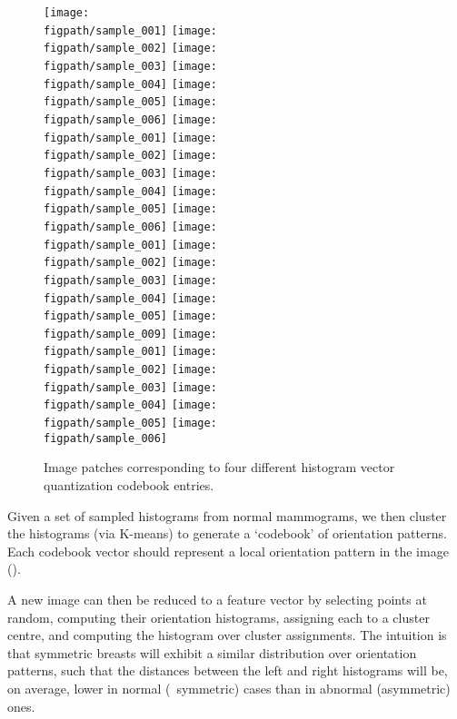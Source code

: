 \begin{figure}[t]
	\centering
		\def\figpath{\figroot/asymmetry/centre_001}
		\texttt{[image: \\figpath/sample\_001]}
		\texttt{[image: \\figpath/sample\_002]}
		\texttt{[image: \\figpath/sample\_003]}
		\texttt{[image: \\figpath/sample\_004]}
		\texttt{[image: \\figpath/sample\_005]}
		\texttt{[image: \\figpath/sample\_006]}%
		\vspace{2pt}%
		\def\figpath{\figroot/asymmetry/centre_031}
		\texttt{[image: \\figpath/sample\_001]}
		\texttt{[image: \\figpath/sample\_002]}
		\texttt{[image: \\figpath/sample\_003]}
		\texttt{[image: \\figpath/sample\_004]}
		\texttt{[image: \\figpath/sample\_005]}
		\texttt{[image: \\figpath/sample\_006]}%
		\vspace{2pt}%
		\def\figpath{\figroot/asymmetry/centre_047}
		\texttt{[image: \\figpath/sample\_001]}
		\texttt{[image: \\figpath/sample\_002]}
		\texttt{[image: \\figpath/sample\_003]}
		\texttt{[image: \\figpath/sample\_004]}
		\texttt{[image: \\figpath/sample\_005]}
		\texttt{[image: \\figpath/sample\_009]}%
		\vspace{2pt}
		\def\figpath{\figroot/asymmetry/centre_046}
		\texttt{[image: \\figpath/sample\_001]}
		\texttt{[image: \\figpath/sample\_002]}
		\texttt{[image: \\figpath/sample\_003]}
		\texttt{[image: \\figpath/sample\_004]}
		\texttt{[image: \\figpath/sample\_005]}
		\texttt{[image: \\figpath/sample\_006]}
%
	\caption{Image patches corresponding to four different histogram vector quantization codebook entries.}
	\label{f:codebook_patches}
\end{figure}

Given a set of sampled histograms from normal mammograms, we then cluster the histograms (via K-means) to generate a `codebook' of orientation patterns. Each codebook vector should represent a local orientation pattern in the image ().

A new image can then be reduced to a feature vector by selecting points at random, computing their orientation histograms, assigning each to a cluster centre, and computing the histogram over cluster assignments. The intuition is that symmetric breasts will exhibit a similar distribution over orientation patterns, such that the distances between the left and right histograms will be, on average, lower in normal (\ie~symmetric) cases than in abnormal (asymmetric) ones.

